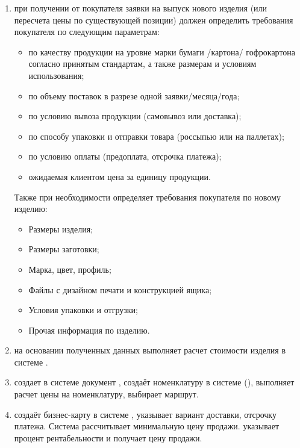 \begin{enumerate}
\item 	\manager при получении от покупателя заявки на выпуск нового изделия (или пересчета цены по существующей позиции) должен определить требования покупателя по следующим параметрам:
\begin{itemize}
    \item  по качеству продукции на уровне марки бумаги /картона/ гофрокартона согласно принятым стандартам, а также размерам и условиям использования;
\item по объему поставок в разрезе одной заявки/месяца/года;
\item по условию вывоза продукции (самовывоз или доставка);
\item по способу упаковки и отправки товара (россыпью или на паллетах);
\item по условию оплаты (предоплата, отсрочка платежа);
\item ожидаемая клиентом цена за единицу продукции.
\end{itemize}

Также при необходимости \manager определяет требования покупателя по новому изделию:
\begin{itemize}
\item	Размеры изделия;
\item	Размеры заготовки;
\item	Марка, цвет, профиль;
\item	Файлы с дизайном печати и конструкцией ящика;
\item	Условия упаковки и отгрузки;
\item	Прочая информация по изделию.
\end{itemize}

\item	\manager на основании полученных данных выполняет расчет стоимости изделия в системе \erp. 
\item \manager создает в системе \erp документ , создаёт номенклатуру в системе (), выполняет расчет цены на номенклатуру,  выбирает маршрут.

\item \manager создаёт бизнес-карту в системе \erp,  указывает вариант доставки, отсрочку платежа. Система \erp рассчитывает минимальную цену продажи. \manager указывает процент рентабельности и получает цену продажи. 


\end{enumerate}

